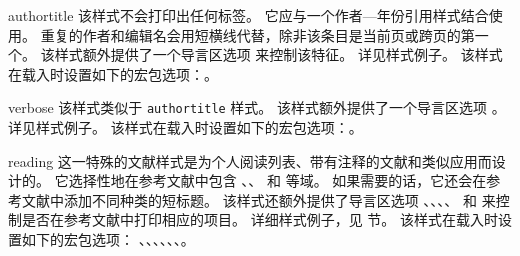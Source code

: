 \begin{marglist}
\item[authortitle]
该样式不会打印出任何标签。
它应与一个作者---年份引用样式结合使用。
重复的作者和编辑名会用短横线代替，除非该条目是当前页或跨页的第一个。
该样式额外提供了一个导言区选项  来控制该特征。
详见样式例子。
该样式在载入时设置如下的宏包选项：。

\item[verbose]
该样式类似于 \texttt{authortitle} 样式。
该样式额外提供了一个导言区选项 。
详见样式例子。
该样式在载入时设置如下的宏包选项：。

\item[reading]
这一特殊的文献样式是为个人阅读列表、带有注释的文献和类似应用而设计的。
它选择性地在参考文献中包含 、、 和  等域。
如果需要的话，它还会在参考文献中添加不同种类的短标题。
该样式还额外提供了导言区选项 、、、、 和  来控制是否在参考文献中打印相应的项目。
详细样式例子，见  节。
该样式在载入时设置如下的宏包选项：
、、、、、、。

\end{marglist}


